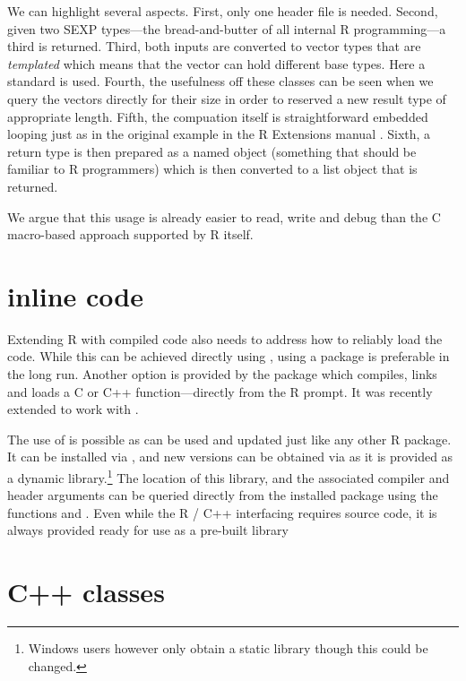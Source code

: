 We can highlight several aspects. First, only one header file is needed.
Second, given two SEXP types---the bread-and-butter of all internal R
programming---a third is returned.  Third, both inputs are converted to
vector types that are \textsl{templated} which means that the vector can hold
different base types. Here a standard  is used. Fourth, the
usefulness off these classes can be seen when we query the vectors directly
for their size in order to reserved a new result type of appropriate length.
Fifth, the compuation itself is straightforward embedded looping just as in
the original example in the R Extensions manual \citep{R:exts}.  Sixth, a
return type is then prepared as a named object (something that should be
familiar to R programmers) which is then converted to a list object that is
returned.

We argue that this usage is already easier to read, write and debug than the
C macro-based approach supported by R itself.

\section{inline code}

Extending R with compiled code also needs to address how to reliably load the
code.  While this can be achieved directly using , using a
package is preferable in the long run.  Another option is
provided by the  package \citep{cran:inline} which compiles,
links and loads a C or C++ function---directly from the R prompt.  It was
recently extended to work with .

The use of  is possible as  can be used and
updated just like any other R package. It can be installed via
, and new versions can be obtained via
 as it is provided as a dynamic
library.\footnote{Windows users however only obtain a static library though
  this could be changed.} The location of this library, and the associated
compiler and header arguments can be queried directly from the installed
package using the functions  and
.  Even while the R / C++ interfacing requires source
code, it is always provided ready for use as a pre-built library


\section{ C++ classes}
\label{sec:new_rcpp}

